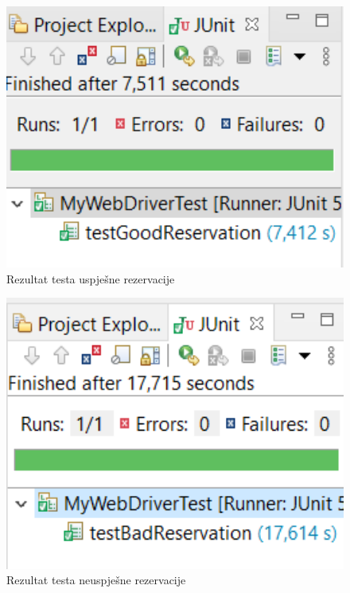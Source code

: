 			\begin{figure}[hp]
                    \centering
                    \includegraphics[width=15cm]{slike/reservationgood.png}
                    \caption{Rezultat testa uspješne rezervacije}
                    \label{fig:useCase-2}
                \end{figure}
			\eject
			
			\begin{figure}[hp]
                    \centering
                    \includegraphics[width=15cm]{slike/reservationbad.png}
                    \caption{Rezultat testa neuspješne rezervacije}
                    \label{fig:useCase-2}
                \end{figure}
			\eject
			
